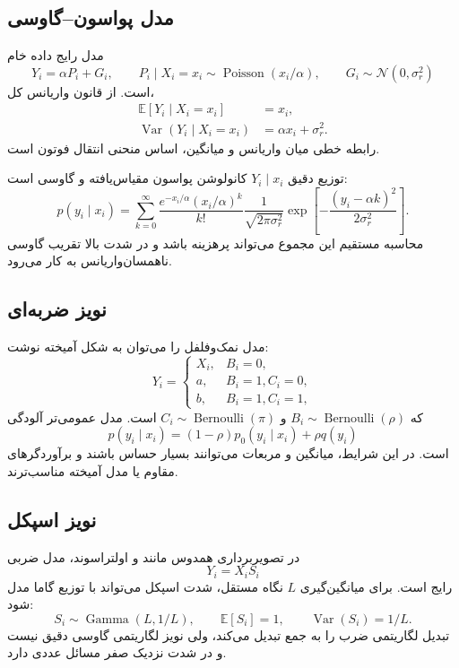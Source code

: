 \documentclass[12pt,openany,oneside]{book}
\newcommand{\E}{\mathbb{E}}
\newcommand{\Var}{\operatorname{Var}}
\newcommand{\Normal}{\mathcal{N}}
\newcommand{\Poisson}{\operatorname{Poisson}}
\newcommand{\GammaD}{\operatorname{Gamma}}
\newcommand{\Bernoulli}{\operatorname{Bernoulli}}
\begin{document}
\subsection{مدل پواسون--گاوسی}

مدل رایج داده خام
\begin{equation}
Y_i=\alpha P_i+G_i,
\qquad
P_i\mid X_i=x_i\sim\Poisson(x_i/\alpha),
\qquad
G_i\sim\Normal(0,\sigma_r^2)
\label{eq:pg}
\end{equation}
است. از قانون واریانس کل،
\begin{align}
\E[Y_i\mid X_i=x_i]&=x_i,\\
\Var(Y_i\mid X_i=x_i)&=\alpha x_i+\sigma_r^2.
\label{eq:mean-variance}
\end{align}
رابطه خطی میان واریانس و میانگین، اساس منحنی انتقال فوتون است.

توزیع دقیق \(Y_i\mid x_i\) کانولوشن پواسون مقیاس‌یافته و گاوسی است:
\begin{equation}
p(y_i\mid x_i)
=
\sum_{k=0}^{\infty}
\frac{e^{-x_i/\alpha}(x_i/\alpha)^k}{k!}
\frac{1}{\sqrt{2\pi\sigma_r^2}}
\exp\left[-\frac{(y_i-\alpha k)^2}{2\sigma_r^2}\right].
\end{equation}
محاسبه مستقیم این مجموع می‌تواند پرهزینه باشد و در شدت بالا تقریب گاوسی ناهمسان‌واریانس به کار می‌رود.

\subsection{نویز ضربه‌ای}

مدل نمک‌وفلفل را می‌توان به شکل آمیخته نوشت:
\begin{equation}
Y_i=
\begin{cases}
X_i,& B_i=0,\\
a,& B_i=1,C_i=0,\\
b,& B_i=1,C_i=1,
\end{cases}
\end{equation}
که \(B_i\sim\Bernoulli(\rho)\) و \(C_i\sim\Bernoulli(\pi)\) است. مدل عمومی‌تر آلودگی
\begin{equation}
p(y_i\mid x_i)=(1-\rho)p_0(y_i\mid x_i)+\rho q(y_i)
\end{equation}
است. در این شرایط، میانگین و مربعات می‌توانند بسیار حساس باشند و برآوردگرهای مقاوم یا مدل آمیخته مناسب‌ترند.

\subsection{نویز اسپکل}

در تصویربرداری همدوس مانند  و اولتراسوند، مدل ضربی
\begin{equation}
Y_i=X_i S_i
\end{equation}
رایج است. برای میانگین‌گیری \(L\) نگاه مستقل، شدت اسپکل می‌تواند با توزیع گاما مدل شود:
\begin{equation}
S_i\sim\GammaD(L,1/L),
\qquad
\E[S_i]=1,
\qquad
\Var(S_i)=1/L.
\end{equation}
تبدیل لگاریتمی ضرب را به جمع تبدیل می‌کند، ولی نویز لگاریتمی گاوسی دقیق نیست و در شدت نزدیک صفر مسائل عددی دارد.
\end{document}
